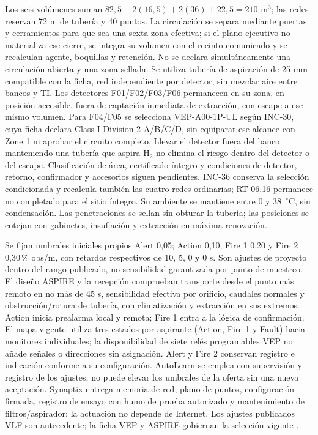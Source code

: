 Los seis volúmenes suman $82,5+2(16,5)+2(36)+22,5=210$ m$^3$; las redes reservan 72 m de tubería y 40 puntos. La circulación se separa mediante puertas y cerramientos para que sea una sexta zona efectiva; si el plano ejecutivo no materializa ese cierre, se integra su volumen con el recinto comunicado y se recalculan agente, boquillas y retención. No se declara simultáneamente una circulación abierta y una zona sellada. Se utiliza tubería de aspiración de 25 mm compatible con la ficha, red independiente por detector, sin mezclar aire entre bancos y TI. Los detectores F01/F02/F03/F06 permanecen en su zona, en posición accesible, fuera de captación inmediata de extracción, con escape a ese mismo volumen. Para F04/F05 se selecciona VEP-A00-1P-UL según INC-30, cuya ficha declara Class I Division 2 A/B/C/D, sin equiparar ese alcance con Zone 1 ni aprobar el circuito completo. Llevar el detector fuera del banco manteniendo una tubería que aspira H$_2$ no elimina el riesgo dentro del detector o del escape. Clasificación de área, certificado íntegro y condiciones de detector, retorno, confirmador y accesorios siguen pendientes. INC-36 conserva la selección condicionada y recalcula también las cuatro redes ordinarias; RT-06.16 permanece no completado para el sitio íntegro. Su ambiente se mantiene entre 0 y 38~$^\circ$C, sin condensación. Las penetraciones se sellan sin obturar la tubería; las posiciones se cotejan con gabinetes, insuflación y extracción en máxima renovación.

Se fijan umbrales iniciales propios Alert 0,05; Action 0,10; Fire 1 0,20 y Fire 2 0,30\,\% obs/m, con retardos respectivos de 10, 5, 0 y 0 s. Son ajustes de proyecto dentro del rango publicado, no sensibilidad garantizada por punto de muestreo. El diseño ASPIRE y la recepción comprueban transporte desde el punto más remoto en no más de 45 s, sensibilidad efectiva por orificio, caudales normales y obstrucción/rotura de tubería, con climatización y extracción en sus extremos. Action inicia prealarma local y remota; Fire 1 entra a la lógica de confirmación. El mapa vigente utiliza tres estados por aspirante (Action, Fire 1 y Fault) hacia monitores individuales; la disponibilidad de siete relés programables VEP no añade señales o direcciones sin asignación. Alert y Fire 2 conservan registro e indicación conforme a su configuración. AutoLearn se emplea con supervisión y registro de los ajustes; no puede elevar los umbrales de la oferta sin una nueva aceptación. Synaptix entrega memoria de red, plano de puntos, configuración firmada, registro de ensayo con humo de prueba autorizado y mantenimiento de filtros/aspirador; la actuación no depende de Internet. Los ajustes publicados VLF son antecedente; la ficha VEP y ASPIRE gobiernan la selección vigente \parencites[p.~2]{l18-vlf500ul}[pp.~1--2]{lote30-vep36106}.

